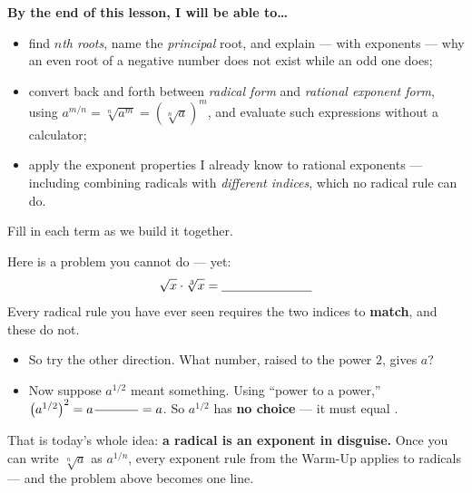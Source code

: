 \documentclass[10pt]{article}
\begin{document}
\namedateperiod

\vspace{0.08in}

\begin{objectivebox}
\textbf{By the end of this lesson, I will be able to\dots}
\begin{itemize}\setlength{\itemsep}{2pt}
  \item find \emph{$n$th roots}, name the \emph{principal} root, and explain --- with exponents --- why an even root of a negative number does not exist while an odd one does;
  \item convert back and forth between \emph{radical form} and \emph{rational exponent form}, using $a^{m/n}=\sqrt[n]{a^m}=\left(\sqrt[n]{a}\right)^m$, and evaluate such expressions without a calculator;
  \item apply the exponent properties I already know to rational exponents --- including combining radicals with \emph{different indices}, which no radical rule can do.
\end{itemize}
\end{objectivebox}

\vspace{0.05in}

\begin{vocabbox}
\small
Fill in each term as we build it together.
\par\vspace{2pt}   %
\end{vocabbox}

\begin{hookbox}
Here is a problem you cannot do --- yet:
\[
  \sqrt{x}\cdot\sqrt[3]{x} = \underline{\hspace{2.5cm}}
\]
Every radical rule you have ever seen requires the two indices to \textbf{match}, and these do not.
\begin{itemize}\setlength{\itemsep}{1pt}
  \item So try the other direction. What number, raised to the power $2$, gives $a$? \writeline
  \item Now suppose $a^{1/2}$ meant something. Using ``power to a power,'' $\left(a^{1/2}\right)^2 = a^{\,\blank{1.2cm}} = a$. So $a^{1/2}$ has \textbf{no choice} --- it must equal \blank{2.2cm}.
\end{itemize}
That is today's whole idea: \textbf{a radical is an exponent in disguise.} Once you can write
$\sqrt[n]{a}$ as $a^{1/n}$, every exponent rule from the Warm-Up applies to radicals --- and the
problem above becomes one line.
\end{hookbox}
\end{document}
